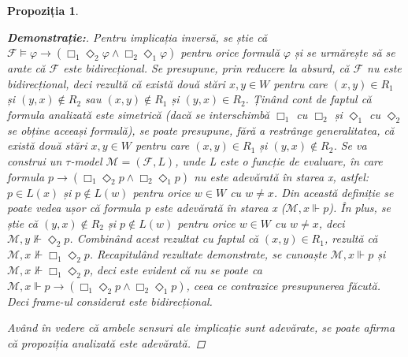 \documentclass[12pt, openany]{book}
\newtheorem{sentence}[definition]{Propoziția} %
\begin{document}
\begin{sentence}
\begin{proof}[\textbf{Demonstrație:}]
                    Pentru implicația inversă, se știe că $\mathcal{F} \vDash \varphi \rightarrow (\Box_1 \Diamond_2 
                    \varphi \wedge \Box_2 \Diamond_1 \varphi)$ pentru orice formulă $\varphi$ și se urmărește să se arate 
                    că $\mathcal{F}$ este bidirecțional. Se presupune, prin reducere la absurd, că $\mathcal{F}$ nu este 
                    bidirecțional, deci rezultă că există două stări $x,y \in W$ pentru care $(x,y) \in R_1$ și $(y,x) 
                    \notin R_2$ sau $(x,y) \notin R_1$ și $(y,x) \in R_2$. Ținând cont de faptul că formula analizată 
                    este simetrică (dacă se interschimbă $\Box_1$ cu $\Box_2$ și $\Diamond_1$ cu $\Diamond_2$ se obține
                    aceeași formulă), se poate presupune, fără a restrânge generalitatea, că există două stări $x,y \in 
                    W$ pentru care $(x,y) \in R_1$ și $(y,x) \notin R_2$. Se va construi un $\tau$-model $\mathcal{M}=(
                    \mathcal{F},L)$, unde L este o funcție de evaluare, în care formula $p \rightarrow (\Box_1 
                    \Diamond_2 p \wedge \Box_2 \Diamond_1 p)$ nu este adevărată în starea x, astfel: $p \in L(x)$ și $p 
                    \notin L(w)$ pentru orice $w \in W$ cu $w \neq x$. Din această definiție se poate vedea ușor că 
                    formula p este adevărată în starea x ($\mathcal{M},x \Vdash p$). În plus, se știe că $(y,x) \notin 
                    R_2$ și $p \notin L(w)$ pentru orice $w \in W$ cu $w \neq x$, deci $\mathcal{M},y \nVdash \Diamond_2 
                    p$. Combinând acest rezultat cu faptul că $(x,y) \in R_1$, rezultă că $\mathcal{M},x \nVdash \Box_1 
                    \Diamond_2 p$. Recapitulând rezultate demonstrate, se cunoaște $\mathcal{M},x \Vdash p$ și 
                    $\mathcal{M},x \nVdash \Box_1 \Diamond_2 p$, deci este evident că nu se poate ca $\mathcal{M},x 
                    \Vdash p \rightarrow (\Box_1 \Diamond_2 p \wedge \Box_2 \Diamond_1 p)$, ceea ce contrazice presupunerea făcută. 
                    Deci \textit{frame}-ul considerat este bidirecțional.

                    Având în vedere că ambele sensuri ale implicație sunt adevărate, se poate afirma că propoziția 
                    analizată este adevărată.
                \end{proof}
            \end{sentence}
\end{document}
